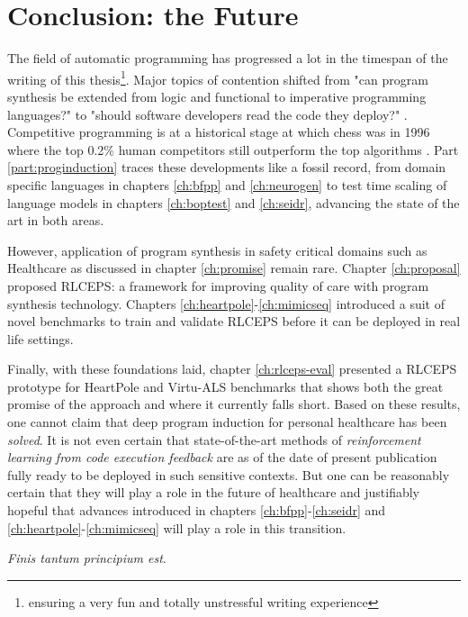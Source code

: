 \chapter{Conclusion: the Future}
\label{ch:conclusion}

The field of automatic programming has progressed a lot in the timespan of the writing of this thesis\footnote{ensuring a very fun and totally unstressful writing experience}.
Major topics of contention shifted from "can program synthesis be extended from logic and functional to imperative programming languages?" \cite{polikarpovaStructuringSynthesisHeapmanipulating2019} to "should software developers read the code they deploy?" \cite{andrejkarpathy[@karpathy]TheresNewKind2025}.
Competitive programming is at a historical stage at which chess was in 1996 \cite{pandolfiniKasparovDeepBlue1997} where the top 0.2\% human competitors still outperform the top algorithms \cite{openaiCompetitiveProgrammingLarge2025}.
Part \ref{part:proginduction} traces these developments like a fossil record, from domain specific languages in chapters \ref{ch:bfpp} and \ref{ch:neurogen} to test time scaling of language models in chapters \ref{ch:boptest} and \ref{ch:seidr}, advancing the state of the art in both areas.

However, application of program synthesis in safety critical domains such as Healthcare as discussed in chapter \ref{ch:promise} remain rare.
Chapter \ref{ch:proposal} proposed RLCEPS: a framework for improving quality of care with program synthesis technology.
Chapters \ref{ch:heartpole}-\ref{ch:mimicseq} introduced a suit of novel benchmarks to train and validate RLCEPS before it can be deployed in real life settings.

Finally, with these foundations laid, chapter \ref{ch:rlceps-eval} presented a RLCEPS prototype for HeartPole and Virtu-ALS benchmarks that shows both the great promise of the approach and where it currently falls short.
Based on these results, one cannot claim that deep program induction for personal healthcare has been \emph{solved}.
It is not even certain that state-of-the-art methods of \emph{reinforcement learning from code execution feedback} are as of the date of present publication fully ready to be deployed in such sensitive contexts.
But one can be reasonably certain that they will play a role in the future of healthcare and justifiably hopeful that advances introduced in chapters \ref{ch:bfpp}-\ref{ch:seidr} and \ref{ch:heartpole}-\ref{ch:mimicseq} will play a role in this transition.

\emph{Finis tantum principium est}.